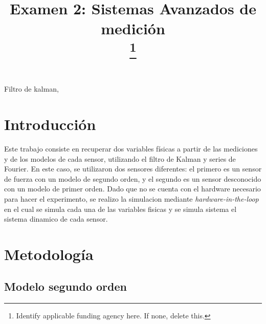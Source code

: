 \documentclass[conference]{IEEEtran}
\begin{document}
\title{Examen 2: Sistemas Avanzados de medici\'on\\
	\thanks{Identify applicable funding agency here. If none, delete this.}
}

\author{
	\and

}

\maketitle

\begin{IEEEkeywords}
	Filtro de kalman,
\end{IEEEkeywords}

\section{Introducción}

Este trabajo consiste en recuperar dos variables físicas a partir de las mediciones y de los modelos de cada sensor, utilizando el filtro de Kalman y series de Fourier. En este caso, se utilizaron dos sensores diferentes: el primero es un sensor de fuerza con un modelo de segundo orden, y el segundo es un sensor desconocido con un modelo de primer orden. Dado que no se cuenta con el hardware necesario para hacer el experimento, se realizo la simulacion mediante \textit{hardware-in-the-loop} en el cual se simula cada una de las variables fisicas y se simula sistema el sistema dinamico de cada sensor.

\section{Metodolog\'ia}




\subsection{Modelo segundo orden}
\end{document}

